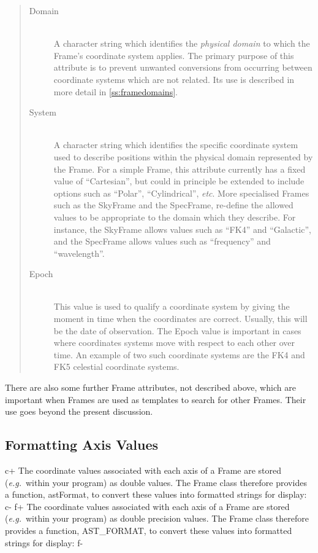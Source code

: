 \documentclass[twoside,11pt]{article}
\newcommand{\secref}[1]{\S\ref{#1}}
\renewcommand{\secref}[1]{\ref{#1}}
\begin{document}
\begin{quote}
\begin{description}
\item[Domain]\mbox{}\\
A character string which identifies the {\em{physical domain}} to
which the Frame's coordinate system applies. The primary purpose of
this attribute is to prevent unwanted conversions from occurring
between coordinate systems which are not related. Its use is described
in more detail in \secref{ss:framedomains}.

\item[System]\mbox{}\\
A character string which identifies the specific coordinate system used
to describe positions within the physical domain represented by the Frame.
For a simple Frame, this attribute currently has a fixed value of 
``Cartesian'', but could in principle be extended to include options such
as ``Polar'', ``Cylindrical'', {\em{etc}}. More specialised Frames such
as the SkyFrame and the SpecFrame, re-define the allowed values to be
appropriate to the domain which they describe. For instance, the SkyFrame
allows values such as ``FK4'' and ``Galactic'', and the SpecFrame allows
values such as ``frequency'' and ``wavelength''. 

\item[Epoch]\mbox{}\\
This value is used to qualify a coordinate system by giving the moment in
time when the coordinates are correct. Usually, this will be the date of
observation. The Epoch value is important in cases where coordinates
systems move with respect to each other over time. An example of two such
coordinate systems are the FK4 and FK5 celestial coordinate systems.

\end{description}
\end{quote}

There are also some further Frame attributes, not described above,
which are important when Frames are used as templates to search for
other Frames. Their use goes beyond the present discussion.

\subsection{\label{ss:formattingaxisvalues}Formatting Axis Values}

c+
The coordinate values associated with each axis of a Frame are stored
({\em{e.g.}}\ within your program) as double values. The Frame class
therefore provides a function, astFormat, to convert these values into
formatted strings for display:
c-
f+
The coordinate values associated with each axis of a Frame are stored
({\em{e.g.}}\ within your program) as double precision values. The
Frame class therefore provides a function, AST\_FORMAT, to convert
these values into formatted strings for display:
f-
\end{document}
